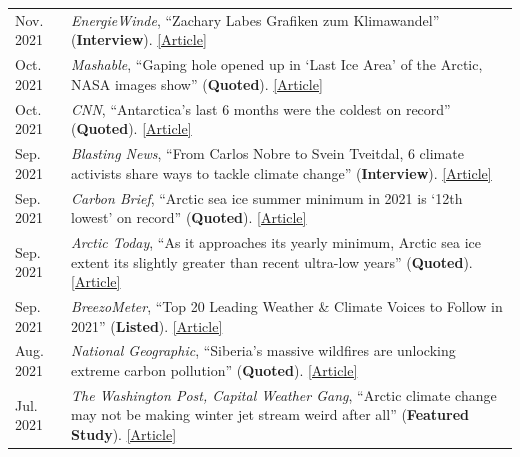 \documentclass[margin,line,palatino,courier,10pt]{res}
\begin{document}
\begin{resume}
\begin{tabular}{@{}p{0.9in}p{4in}}
Nov. 2021 & \textit{EnergieWinde}, ``Zachary Labes Grafiken zum Klimawandel'' (\textbf{Interview}). \href{https://energiewinde.orsted.de/klimawandel-umwelt/zachary-labe-grafiken-arktis-klimawandel-interview-wissenschaftskommunikation}{[Article]}\\
Oct. 2021 & \textit{Mashable}, ``Gaping hole opened up in `Last Ice Area' of the Arctic, NASA images show'' (\textbf{Quoted}). \href{https://mashable.com/article/arctic-climate-change}{[Article]}\\
Oct. 2021 & \textit{CNN}, ``Antarctica's last 6 months were the coldest on record'' (\textbf{Quoted}). \href{https://www.cnn.com/2021/10/09/weather/weather-record-cold-antarctica-climate-change/index.html}{[Article]}\\
Sep. 2021 & \textit{Blasting News}, ``From Carlos Nobre to Svein Tveitdal, 6 climate activists share ways to tackle climate change'' (\textbf{Interview}). \href{https://us.blastingnews.com/world/2021/01/from-carlos-nobre-to-svein-tveitdal-4-climate-activists-share-ways-to-tackle-climate-change-003258138.html}{[Article]}\\
Sep. 2021 & \textit{Carbon Brief}, ``Arctic sea ice summer minimum in 2021 is `12th lowest' on record'' (\textbf{Quoted}). \href{https://www.carbonbrief.org/arctic-sea-ice-summer-minimum-in-2021-is-12th-lowest-on-record}{[Article]}\\
Sep. 2021 & \textit{Arctic Today}, ``As it approaches its yearly minimum, Arctic sea ice extent its slightly greater than recent ultra-low years'' (\textbf{Quoted}). \href{https://www.arctictoday.com/as-it-approaches-its-yearly-minimum-arctic-sea-ice-extent-its-slightly-greater-than-recent-ultra-low-years/}{[Article]}\\
Sep. 2021 & \textit{BreezoMeter}, ``Top 20 Leading Weather \& Climate Voices to Follow in 2021'' (\textbf{Listed}). \href{https://blog.breezometer.com/leading-weather-climate-voices-to-follow}{[Article]}\\
Aug. 2021 & \textit{National Geographic}, ``Siberia’s massive wildfires are unlocking extreme carbon pollution'' (\textbf{Quoted}). \href{https://www.nationalgeographic.com/environment/article/siberias-massive-wildfires-are-unlocking-extreme-carbon-pollution}{[Article]}\\
Jul. 2021 & \textit{The Washington Post, Capital Weather Gang}, ``Arctic climate change may not be making winter jet stream weird after all'' (\textbf{Featured Study}). \href{https://www.washingtonpost.com/weather/2021/07/31/arctic-climate-change-jetstream-winter/}{[Article]}\\

\end{tabular}
\end{resume}
\end{document}
